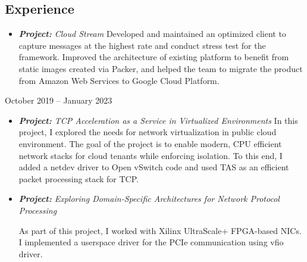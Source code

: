 \documentclass[../main.tex]{subfiles}
\begin{document}
  \begin{category}
    \section{Experience}
      \begin{itemize}
        \item \emph{\textbf{Project:} Cloud Stream}
        Developed and maintained an optimized client
        to capture messages at the highest rate and conduct stress 
        test for the framework. 
        Improved the architecture of existing platform to benefit 
        from static images created via Packer, and helped the team 
        to migrate the product from Amazon Web Services to Google 
        Cloud Platform.
      \end{itemize}

     \strut\hfill October 2019 -- January 2023\\[-9pt]
      \begin{itemize}
        \item \emph{\textbf{Project:} 
          TCP Acceleration as a Service in Virtualized Environments
        }
        In this project, I explored the needs for network 
        virtualization in public cloud environment. The 
        goal of the project is to enable modern, CPU efficient 
        network stacks for cloud tenants while enforcing 
        isolation. To this end, I added a netdev driver to 
        Open vSwitch code and used TAS as an efficient
        packet processing stack for TCP.

        \item \emph{\textbf{Project:} 
          Exploring Domain-Specific Architectures 
          for Network Protocol Processing
        } 

        As part of this project, I worked with 
        Xilinx UltraScale+ FPGA-based NICs. I implemented a 
        userspace driver for the PCIe communication using 
        vfio driver.


\end{itemize}
\end{category}
\end{document}
